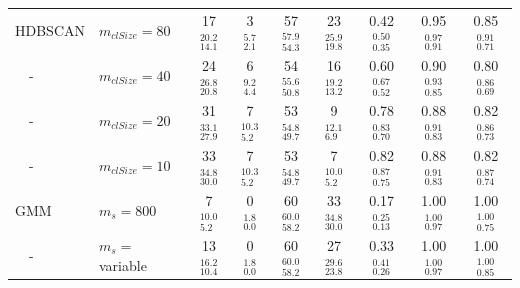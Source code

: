 \begin{table}
\begin{tabular}{l l | c c c c | c c c}
\hline

HDBSCAN   & $m_{clSize} = 80$            & 17 $^{20.2}_{14.1}$ & 3 $^{5.7}_{2.1}$ & 57 $^{57.9}_{54.3}$ & 23 $^{25.9}_{19.8}$ & 0.42 $^{0.50}_{0.35}$ & 0.95 $^{0.97}_{0.91}$ & 0.85 $^{0.91}_{0.71}$ \rule{0pt}{0.35cm}\\[0.1cm]
$\quad$-  & $m_{clSize} = 40$            & 24 $^{26.8}_{20.8}$ & 6 $^{9.2}_{4.4}$ & 54 $^{55.6}_{50.8}$ & 16 $^{19.2}_{13.2}$ & 0.60 $^{0.67}_{0.52}$ & 0.90 $^{0.93}_{0.85}$ & 0.80 $^{0.86}_{0.69}$ \\[0.1cm]
$\quad$-  & $m_{clSize} = 20$            & 31 $^{33.1}_{27.9}$ & 7 $^{10.3}_{5.2}$ & 53 $^{54.8}_{49.7}$ & 9 $^{12.1}_{6.9}$ & 0.78 $^{0.83}_{0.70}$ & 0.88 $^{0.91}_{0.83}$ & 0.82 $^{0.86}_{0.73}$ \\[0.1cm]
$\quad$-  & $m_{clSize} = 10$            & 33 $^{34.8}_{30.0}$ & 7 $^{10.3}_{5.2}$ & 53 $^{54.8}_{49.7}$ & 7 $^{10.0}_{5.2}$ & 0.82 $^{0.87}_{0.75}$ & 0.88 $^{0.91}_{0.83}$ & 0.82 $^{0.87}_{0.74}$ \\[0.1cm]

\hline

GMM       & $m_{s} = 800$                & 7 $^{10.0}_{5.2}$ & 0 $^{1.8}_{0.0}$ & 60 $^{60.0}_{58.2}$ & 33 $^{34.8}_{30.0}$ & 0.17 $^{0.25}_{0.13}$ & 1.00 $^{1.00}_{0.97}$ & 1.00 $^{1.00}_{0.75}$ \rule{0pt}{0.35cm}\\[0.1cm]
$\quad$-  & $m_{s} = $ variable          & 13 $^{16.2}_{10.4}$ & 0 $^{1.8}_{0.0}$ & 60 $^{60.0}_{58.2}$ & 27 $^{29.6}_{23.8}$ & 0.33 $^{0.41}_{0.26}$ & 1.00 $^{1.00}_{0.97}$ & 1.00 $^{1.00}_{0.85}$ \\[0.1cm]



\hline                                             %
\end{tabular}


\end{table}

